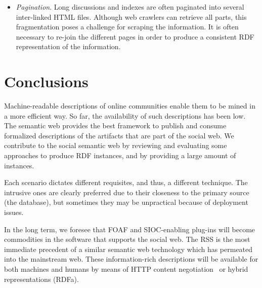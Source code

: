 \documentclass{../templates/www2008-submission}
\begin{document}
\begin{itemize}
  \item \emph{Pagination}. Long discussions and indexes are often paginated
        into several inter-linked HTML files. Although web crawlers can
        retrieve all parts, this fragmentation poses a challenge for
        scraping the information. It is often necessary to re-join the
        different pages in order to produce a consistent RDF representation
        of the information.

\end{itemize}


\section{Conclusions}\label{sec:conclusions}

Machine-readable descriptions of online communities enable them
to be mined in a more efficient way. So far, the availability of
such descriptions has been low. The semantic web provides the
best framework to publish and consume formalized descriptions of
the artifacts that are part of the social web. We contribute
to the social semantic web by reviewing and evaluating some approaches
to produce RDF instances, and by providing a large amount of
instances.

Each scenario dictates different requisites, and thus, a different
technique. The intrusive ones are clearly preferred due to their
closeness to the primary source (the database), but sometimes they may be
unpractical because of deployment issues.

In the long term, we foresee that FOAF and SIOC-enabling plug-ins
will become commodities in the software that supports the social
web. The RSS is the most immediate precedent of a similar semantic web
technology which has permeated into the mainstream web. These information-rich
descriptions will
be available for both machines and humans by means of HTTP
content negotiation~\cite{Recipes} or hybrid representations (RDFa).




\balancecolumns
\end{document}
